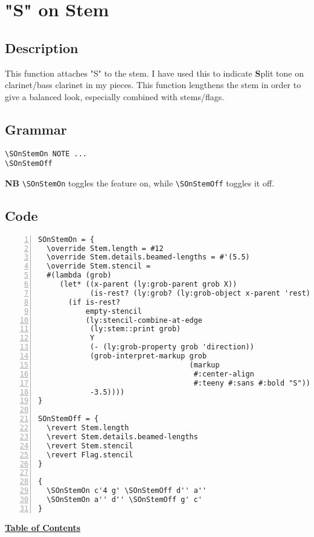 \vfill \break




\section {"S" on Stem}
\hfill

\subsection{Description}
This function attaches "S" to the stem. I have used this to indicate \textbf{S}plit tone on clarinet/bass clarinet in my pieces. This function lengthens the stem in order to give a balanced look, especially combined with stems/flags. 
\subsection{Grammar}
\begin{verbatim}
\SOnStemOn NOTE ...
\SOnStemOff
\end{verbatim}
\textbf{NB} \verb|\SOnStemOn| toggles the feature on, while \verb|\SOnStemOff| toggles it off.

\subsection{Code}
\begin{Verbatim}[numbers=left,xleftmargin=5mm]
SOnStemOn = {
  \override Stem.length = #12
  \override Stem.details.beamed-lengths = #'(5.5)
  \override Stem.stencil =
  #(lambda (grob)
     (let* ((x-parent (ly:grob-parent grob X))
            (is-rest? (ly:grob? (ly:grob-object x-parent 'rest))))
       (if is-rest?
           empty-stencil
           (ly:stencil-combine-at-edge
            (ly:stem::print grob)
            Y
            (- (ly:grob-property grob 'direction))
            (grob-interpret-markup grob
                                   (markup
                                    #:center-align
                                    #:teeny #:sans #:bold "S"))
            -3.5))))
}

SOnStemOff = {
  \revert Stem.length
  \revert Stem.details.beamed-lengths
  \revert Stem.stencil
  \revert Flag.stencil
}

{
  \SOnStemOn c'4 g' \SOnStemOff d'' a''
  \SOnStemOn a'' d'' \SOnStemOff g' c'
}
\end{Verbatim}
\hyperref[sec:toc]{\textbf{Table of Contents}}

